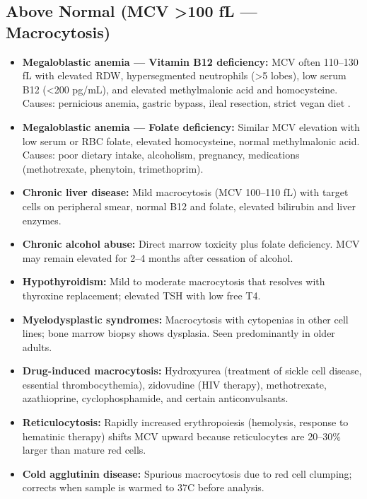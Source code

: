 \subsection*{Above Normal (MCV >100 fL --- Macrocytosis)}
\begin{itemize}
  \item \textbf{Megaloblastic anemia --- Vitamin B12 deficiency:} MCV often 110--130 fL with elevated RDW, hypersegmented neutrophils (>5 lobes), low serum B12 (<200 pg/mL), and elevated methylmalonic acid and homocysteine. Causes: pernicious anemia, gastric bypass, ileal resection, strict vegan diet \cite{green2017megaloblastic}.
  \item \textbf{Megaloblastic anemia --- Folate deficiency:} Similar MCV elevation with low serum or RBC folate, elevated homocysteine, normal methylmalonic acid. Causes: poor dietary intake, alcoholism, pregnancy, medications (methotrexate, phenytoin, trimethoprim).
  \item \textbf{Chronic liver disease:} Mild macrocytosis (MCV 100--110 fL) with target cells on peripheral smear, normal B12 and folate, elevated bilirubin and liver enzymes.
  \item \textbf{Chronic alcohol abuse:} Direct marrow toxicity plus folate deficiency. MCV may remain elevated for 2--4 months after cessation of alcohol.
  \item \textbf{Hypothyroidism:} Mild to moderate macrocytosis that resolves with thyroxine replacement; elevated TSH with low free T4.
  \item \textbf{Myelodysplastic syndromes:} Macrocytosis with cytopenias in other cell lines; bone marrow biopsy shows dysplasia. Seen predominantly in older adults.
  \item \textbf{Drug-induced macrocytosis:} Hydroxyurea (treatment of sickle cell disease, essential thrombocythemia), zidovudine (HIV therapy), methotrexate, azathioprine, cyclophosphamide, and certain anticonvulsants.
  \item \textbf{Reticulocytosis:} Rapidly increased erythropoiesis (hemolysis, response to hematinic therapy) shifts MCV upward because reticulocytes are 20--30\% larger than mature red cells.
  \item \textbf{Cold agglutinin disease:} Spurious macrocytosis due to red cell clumping; corrects when sample is warmed to 37\textdegree{}C before analysis.
\end{itemize}

